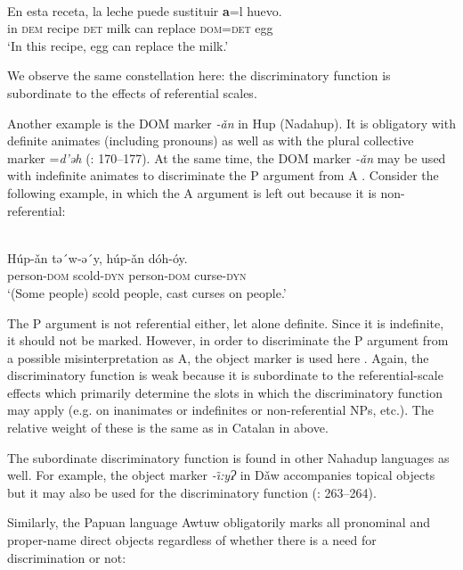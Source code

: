 \documentclass[output=paper]{langsci/langscibook}
\begin{document}
\ea\label{ex:serzant:16}
\\
\gll En esta receta, la   leche   puede   sustituir \textbf{a}=l     huevo.\\
     in  \textsc{dem} recipe \textsc{det}   milk   can   replace \textsc{dom=det}   egg\\
\glt ‘In this recipe, egg can replace the milk.’
\z

We observe the same constellation here: the discriminatory function is subordinate to the effects of referential scales. 

Another example is the DOM marker \textit{{}-ǎn} in Hup (Nadahup). It is obligatory with definite animates (including pronouns) as well as with the plural collective marker =\textit{d’ǝh} (\citealt{Epps2008}: 170–177). At the same time, the DOM marker \textit{{}-ǎn} may be used with indefinite animates to discriminate the P argument from A \citep[95]{Epps2009_DOM}. Consider the following example, in which the A argument is left out because it is non-referential: 

\ea\label{ex:serzant:17}
\\
\gll Húp-ǎn   tǝ´w-ǝ´y,   húp-ǎn    dóh-óy.\\
     person-\textsc{dom}  scold-\textsc{dyn}  person-\textsc{dom}  curse-\textsc{dyn}\\
\glt ‘(Some people) scold people, cast curses on people.’
\z

The P argument is not referential either, let alone definite. Since it is indefinite, it should not be marked. However, in order to discriminate the P argument from a possible misinterpretation as A, the object marker is used here \citep[95]{Epps2009_DOM}. Again, the discriminatory function is weak because it is subordinate to the referential-scale effects which primarily determine the slots in which the discriminatory function may apply (e.g. on inanimates or indefinites or non-referential NPs, etc.). The relative weight of these is the same as in Catalan in  above. 

The subordinate discriminatory function is found in other Nahadup languages as well. For example, the object marker \textit{{}-\~\i:yɁ} in Dǎw accompanies topical objects but it may also be used for the discriminatory function (\citealt{MartinsMartins1999}: 263–264). 

Similarly, the Papuan language Awtuw obligatorily marks all pronominal and proper-name direct objects regardless of whether there is a need for discrimination or not:
\end{document}
